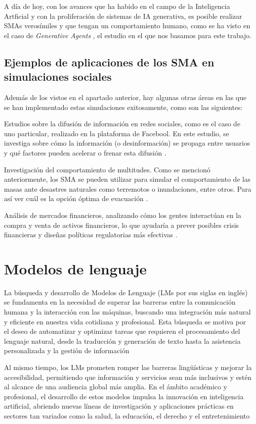 A día de hoy, con los avances que ha habido en el campo de la Inteligencia Artficial y con la proliferación de sistemas de IA generativa, es posible realizar SMAs verosímiles y que tengan un comportamiento humano, como se ha visto en el caso de \textit{Generative Agents} \citep{park2023generative}, el estudio en el que nos basamos para este trabajo.

\subsection{Ejemplos de aplicaciones de los SMA en simulaciones sociales}
Además de los vistos en el apartado anterior, hay algunas otras áreas en las que se han implementado estas simulaciones exitosamente, como son las siguientes:

Estudios sobre la difusión de información en redes sociales, como es el caso de uno particular, realizado en la plataforma de Facebool. En este estudio, se investiga sobre cómo la información (o desinformación) se propaga entre usuarios y qué factores pueden acelerar o frenar esta difusión \citep{gambo2020investigative}.

Investigación del comportamiento de multitudes. Como se mencionó anteriormente, los SMA se pueden utilizar para simular el comportamiento de las masas ante desastres naturales como terremotos o inundaciones, entre otros. Para así ver cuál es la opción óptima de evacuación \citep{Marks_2012}.

Análisis de mercados financieros, analizando cómo los gentes interactúan en la compra y venta de activos financieros, lo que ayudaría a prever posibles crisis financieras y diseñas políticas regulatorias más efectivas \citep{Marks_2012}.

\section{Modelos de lenguaje}

La búsqueda y desarrollo de Modelos de Lenguaje (LMs por sus siglas en inglés) se fundamenta en la necesidad de superar las barreras entre la comunicación humana y la interacción con las máquinas, buscando una integración más natural y eficiente en nuestra vida cotidiana y profesional.  Esta búsqueda se motiva por el deseo de automatizar y optimizar tareas que requieren el procesamiento del lenguaje natural, desde la traducción y generación de texto hasta la asistencia personalizada y la gestión de información

Al mismo tiempo, los LMs prometen romper las barreras lingüísticas y mejorar la accesibilidad, permitiendo que información y servicios sean más inclusivos y estén al alcance de una audiencia global más amplia. En el ámbito académico y profesional, el desarrollo de estos modelos impulsa la innovación en inteligencia artificial, abriendo nuevas líneas de investigación y aplicaciones prácticas en sectores tan variados como la salud, la educación, el derecho y el entretenimiento

